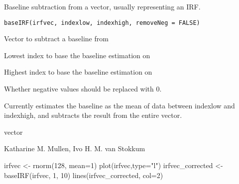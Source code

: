 \begin{Description}\relax
Baseline subtraction from a vector, usually representing an IRF.
\end{Description}
\begin{Usage}
\begin{verbatim}
baseIRF(irfvec, indexlow, indexhigh, removeNeg = FALSE) 
\end{verbatim}
\end{Usage}
\begin{Arguments}
\begin{ldescription}
\item[\code{irfvec}] Vector to subtract a baseline from
\item[\code{indexlow}] Lowest index to base the baseline estimation on
\item[\code{indexhigh}] Highest index to base the baseline estimation on
\item[\code{removeNeg}] Whether negative values should be replaced with 0.
\end{ldescription}
\end{Arguments}
\begin{Details}\relax
Currently estimates the baseline as the mean of data between 
indexlow and indexhigh, and subtracts the result from the 
entire vector.
\end{Details}
\begin{Value}
vector
\end{Value}
\begin{Author}\relax
Katharine M. Mullen, Ivo H. M. van Stokkum
\end{Author}
\begin{Examples}
\begin{ExampleCode} 
irfvec <- rnorm(128, mean=1) 
plot(irfvec,type="l") 
irfvec_corrected <- baseIRF(irfvec, 1, 10)
lines(irfvec_corrected, col=2)
\end{ExampleCode}
\end{Examples}

